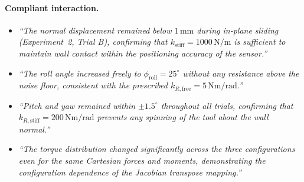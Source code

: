 \paragraph{Compliant interaction.}
\begin{itemize}
  \item \textit{``The normal displacement remained below $1\,\mathrm{mm}$
        during in-plane sliding (Experiment~2, Trial B), confirming that
        $k_{\mathrm{stiff}} = 1000\,\mathrm{N/m}$ is sufficient to maintain
        wall contact within the positioning accuracy of the sensor.''}
  \item \textit{``The roll angle increased freely to $\phi_{\mathrm{roll}} = 25^{\circ}$
        without any resistance above the noise floor, consistent with the
        prescribed $k_{R,\mathrm{free}} = 5\,\mathrm{Nm/rad}$.''}
  \item \textit{``Pitch and yaw remained within $\pm 1.5^{\circ}$ throughout all
        trials, confirming that $k_{R,\mathrm{stiff}} = 200\,\mathrm{Nm/rad}$
        prevents any spinning of the tool about the wall normal.''}
  \item \textit{``The torque distribution changed significantly across the
        three configurations even for the same Cartesian forces and moments, demonstrating
        the configuration dependence of the Jacobian transpose mapping.''}
\end{itemize}
